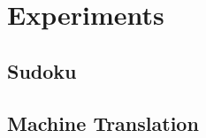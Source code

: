 \section{Experiments}
\label{sec:experiments}

\subsection{Sudoku}
\label{sec:sudoku}

\subsection{Machine Translation}
\label{sec:mt}